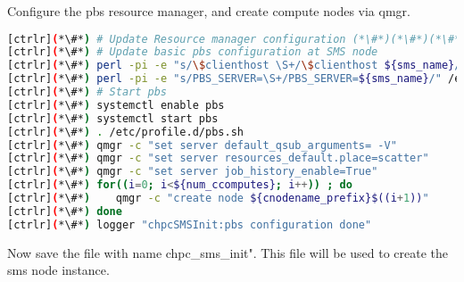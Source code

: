 
	Configure the pbs resource manager, and create compute nodes via qmgr.



\begin{lstlisting}[language=bash,keywords={}]
[ctrlr](*\#*) # Update Resource manager configuration (*\#*)(*\#*)(*\#*)
[ctrlr](*\#*) # Update basic pbs configuration at SMS node
[ctrlr](*\#*) perl -pi -e "s/\$clienthost \S+/\$clienthost ${sms_name}/" /var/spool/pbs/mom_priv/config
[ctrlr](*\#*) perl -pi -e "s/PBS_SERVER=\S+/PBS_SERVER=${sms_name}/" /etc/pbs.conf
[ctrlr](*\#*) # Start pbs 
[ctrlr](*\#*) systemctl enable pbs
[ctrlr](*\#*) systemctl start pbs
[ctrlr](*\#*) . /etc/profile.d/pbs.sh
[ctrlr](*\#*) qmgr -c "set server default_qsub_arguments= -V" 
[ctrlr](*\#*) qmgr -c "set server resources_default.place=scatter"
[ctrlr](*\#*) qmgr -c "set server job_history_enable=True"
[ctrlr](*\#*) for((i=0; i<${num_ccomputes}; i++)) ; do
[ctrlr](*\#*)    qmgr -c "create node ${cnodename_prefix}$((i+1))"
[ctrlr](*\#*) done
[ctrlr](*\#*) logger "chpcSMSInit:pbs configuration done"
\end{lstlisting} 


	Now save the file with name chpc\_sms\_init". This file will be used to create the sms node instance.

